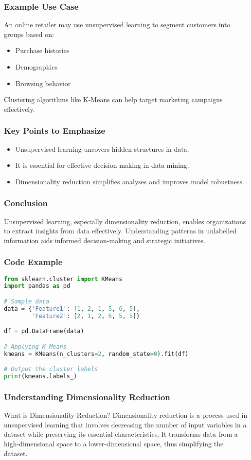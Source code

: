 \documentclass[aspectratio=169]{beamer}
\begin{document}
\begin{frame}[fragile]
    \frametitle{Example Use Case}
    An online retailer may use unsupervised learning to segment customers into groups based on:
    \begin{itemize}
        \item Purchase histories
        \item Demographics
        \item Browsing behavior
    \end{itemize}
    Clustering algorithms like K-Means can help target marketing campaigns effectively.
\end{frame}

\begin{frame}[fragile]
    \frametitle{Key Points to Emphasize}
    \begin{itemize}
        \item Unsupervised learning uncovers hidden structures in data.
        \item It is essential for effective decision-making in data mining.
        \item Dimensionality reduction simplifies analyses and improves model robustness.
    \end{itemize}
\end{frame}

\begin{frame}[fragile]
    \frametitle{Conclusion}
    Unsupervised learning, especially dimensionality reduction, enables organizations to extract insights from data effectively. Understanding patterns in unlabelled information aids informed decision-making and strategic initiatives.
\end{frame}

\begin{frame}[fragile]
    \frametitle{Code Example}
    \begin{lstlisting}[language=Python]
from sklearn.cluster import KMeans
import pandas as pd

# Sample data
data = {'Feature1': [1, 2, 1, 5, 6, 5],
        'Feature2': [2, 1, 2, 6, 5, 5]}

df = pd.DataFrame(data)

# Applying K-Means
kmeans = KMeans(n_clusters=2, random_state=0).fit(df)

# Output the cluster labels
print(kmeans.labels_)
    \end{lstlisting}
\end{frame}

\begin{frame}[fragile]
    \frametitle{Understanding Dimensionality Reduction}
    \begin{block}{What is Dimensionality Reduction?}
        Dimensionality reduction is a process used in unsupervised learning that involves decreasing the number of input variables in a dataset while preserving its essential characteristics. 
        It transforms data from a high-dimensional space to a lower-dimensional space, thus simplifying the dataset.
    \end{block}
\end{frame}
\end{document}
